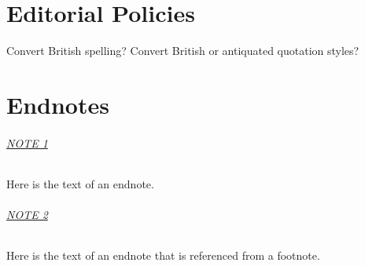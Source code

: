 \documentclass[
]{book}
\begin{document}
\hypertarget{editorial-policies}{%
\chapter{Editorial Policies}\label{editorial-policies}}

Convert British spelling?
Convert British or antiquated quotation styles?

\hypertarget{endnotes-1}{%
\chapter*{Endnotes}\label{endnotes-1}}

\hypertarget{en.01}{%
\subparagraph*{\texorpdfstring{\protect\hyperlink{en.01.backlink}{NOTE 1}}{NOTE 1}}\label{en.01}}

Here is the text of an endnote.

\hypertarget{en.02}{%
\subparagraph*{\texorpdfstring{\protect\hyperlink{en.02.backlink}{NOTE 2}}{NOTE 2}}\label{en.02}}

Here is the text of an endnote that is referenced from a footnote.
\end{document}
